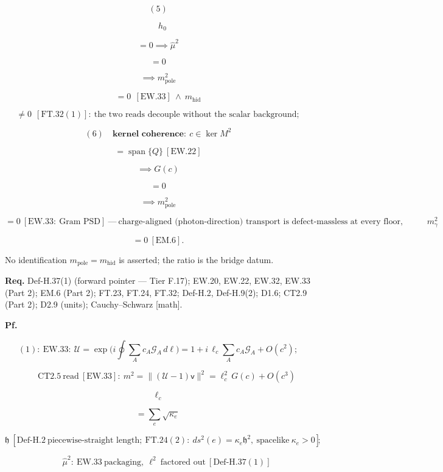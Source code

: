 \begin{theorem}
\[
(5)
\]

\[
\quad h_0
\]

\[
= 0\implies\hat\mu^2
\]

\[
= 0
\]

\[
\implies m_{\mathrm{pole}}^2
\]

\[
= 0\ \ [\mathrm{EW.33}]\ \wedge\ m_{\mathrm{hid}}
\]

\[
\ne 0\ \ [\mathrm{FT.32}(1)]:\ \text{the two reads decouple without the scalar background};
\]

\[
(6)\quad\textbf{kernel coherence}:\ c\in\ker M^2
\]

\[
= \operatorname{span}\{Q\}\ [\mathrm{EW.22}]
\]

\[
\implies G(c)
\]

\[
= 0
\]

\[
\implies m_{\mathrm{pole}}^2
\]

\[
= 0\ [\mathrm{EW.33}:\ \text{Gram PSD}]\ —\ \text{charge-aligned (photon-direction) transport is defect-massless at every floor, matching}\ m_\gamma^2
\]

\[
= 0\ [\mathrm{EM.6}].
\]

No identification $m_{\mathrm{pole}}=m_{\mathrm{hid}}$ is asserted; the ratio is the bridge datum.

\textbf{Req.} Def-H.37(1) (forward pointer — Tier F.17); EW.20, EW.22, EW.32, EW.33 (Part 2); EM.6 (Part 2); FT.23, FT.24, FT.32; Def-H.2, Def-H.9(2); D1.6; CT2.9 (Part 2); D2.9 (units); Cauchy–Schwarz [math].

\textbf{Pf.}

\[
(1):\ \mathrm{EW.33}:\ \mathcal U=\exp\bigl(i\oint\textstyle\sum_Ac_A\mathcal G_A\,d\ell\bigr)=1+i\,\ell_c\sum_Ac_A\mathcal G_A+O(c^2);
\]

\[
\qquad \mathrm{CT2.5}\ \text{read}\ [\mathrm{EW.33}]:\ m^2=\|(\mathcal U-1)\mathsf v\|^2=\ell_c^2\,G(c)+O(c^3)
\]

\[
\ell_c
\]

\[
= \textstyle\sum_e\sqrt{\kappa_e}\,
\]

\[
\mathfrak h\ [\mathrm{Def\text{-}H.2}\ \text{piecewise-straight length};\ \mathrm{FT.24}(2):\ ds^2(e)=\kappa_e\mathfrak h^2,\ \text{spacelike}\ \kappa_e>0];
\]

\[
\qquad \hat\mu^2:\ \mathrm{EW.33}\ \text{packaging},\ \ell^2\ \text{factored out}\ [\mathrm{Def\text{-}H.37(1)}]
\]


\end{theorem}
